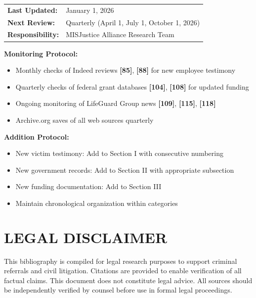 \documentclass[11pt,letterpaper]{article}
\newcommand{\citeref}[1]{\textbf{\color{NavyBlue}[#1]}}
\begin{document}
\begin{tabular}{@{}p{1.6in}p{4.4in}@{}}
\textbf{Last Updated:} & January 1, 2026\\
\textbf{Next Review:} & Quarterly (April 1, July 1, October 1, 2026)\\
\textbf{Responsibility:} & MISJustice Alliance Research Team\\
\end{tabular}

\vspace{0.2in}

\textbf{Monitoring Protocol:}
\begin{itemize}[leftmargin=*]
\item Monthly checks of Indeed reviews \citeref{85}, \citeref{88} for new employee testimony
\item Quarterly checks of federal grant databases \citeref{104}, \citeref{108} for updated funding
\item Ongoing monitoring of LifeGuard Group news \citeref{109}, \citeref{115}, \citeref{118}
\item Archive.org saves of all web sources quarterly
\end{itemize}

\textbf{Addition Protocol:}
\begin{itemize}[leftmargin=*]
\item New victim testimony: Add to Section I with consecutive numbering
\item New government records: Add to Section II with appropriate subsection
\item New funding documentation: Add to Section III
\item Maintain chronological organization within categories
\end{itemize}

\newpage

\section{LEGAL DISCLAIMER}

This bibliography is compiled for legal research purposes to support criminal referrals and civil litigation. Citations are provided to enable verification of all factual claims. This document does not constitute legal advice. All sources should be independently verified by counsel before use in formal legal proceedings.

\vspace{0.3in}
\end{document}
